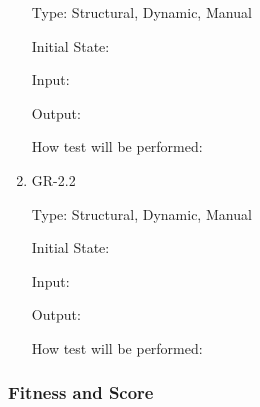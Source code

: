 \documentclass[12pt, titlepage]{article}
\begin{document}
\begin{enumerate}
Type: Structural, Dynamic, Manual
					
Initial State: 
					
Input: 
					
Output: 
					
How test will be performed: 

\item{GR-2.2\\}

Type: Structural, Dynamic, Manual
					
Initial State: 
					
Input: 
					
Output: 
					
How test will be performed: 

\end{enumerate}

\subsubsection{Fitness and Score}
\end{document}
